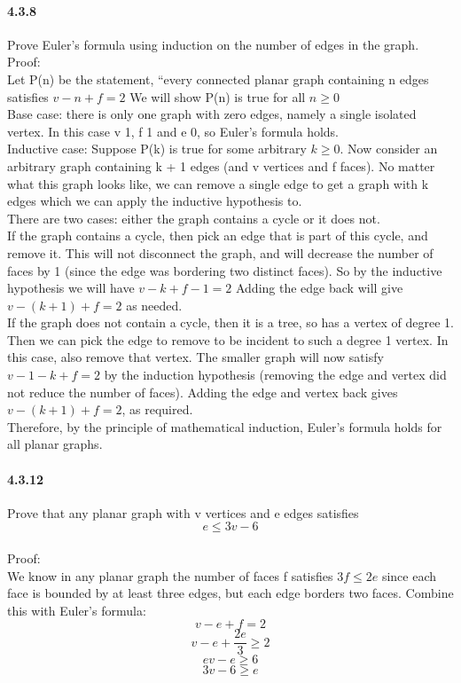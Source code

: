 \documentclass{article}
\begin{document}
\paragraph{4.3.8}
Prove Euler’s formula using induction on the number of edges in the graph.\\
Proof:\\
Let P(n) be the statement, “every connected planar graph containing n edges satisfies $v-n+f=2$ We will show P(n) is true for
all $n \ge 0$\\
Base case: there is only one graph with zero edges, namely a single isolated vertex. In this case v  1, f  1 and e  0, so Euler’s formula holds.\\
Inductive case: Suppose P(k) is true for some arbitrary $k \geq 0$. Now consider an arbitrary graph containing k + 1 edges (and v vertices and f faces). No matter what this graph looks like, we can remove a single edge
to get a graph with k edges which we can apply the inductive hypothesis to.\\
There are two cases: either the graph contains a cycle or it does not.\\
If the graph contains a cycle, then pick an edge that is part of this cycle, and remove it. This will not disconnect the graph, and will decrease the number of faces by 1 (since the edge was bordering two distinct faces). So by the inductive hypothesis we will have $v-k+f-1=2$  Adding the edge back will give $v-(k+1)+f=2$ as needed.\\
If the graph does not contain a cycle, then it is a tree, so has a vertex of degree 1. Then we can pick the edge to remove to be incident to such a degree 1 vertex. In this case, also remove that vertex. The smaller graph will now satisfy $v-1-k+f=2$ by the induction hypothesis (removing the edge and vertex did not reduce the number of faces). Adding the edge and vertex back gives $v-(k+1)+f=2$, as required.\\
Therefore, by the principle of mathematical induction, Euler’s formula holds for all planar graphs.
\paragraph{4.3.12}
Prove that any planar graph with v vertices and e edges satisfies $$e\leq 3v-6$$\\
Proof:\\
We know in any planar graph the number of faces f satisfies $3f\leq 2e$ since each face is bounded by at least three edges, but each edge borders two faces. Combine this with Euler’s formula:
$$v-e+f=2$$
$$v-e+\frac{2e}{3}\ge 2$$
$$ev-e\ge 6$$
$$3v-6\ge e$$
\end{document}
